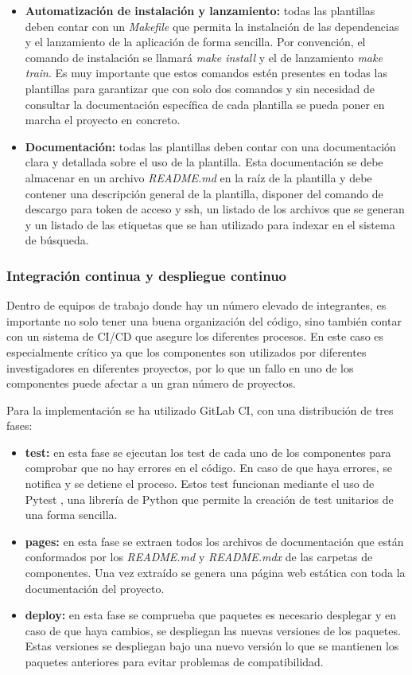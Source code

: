 \begin{itemize}
    \item \textbf{Automatización de instalación y lanzamiento:} todas las plantillas
    deben contar con un \textit{Makefile} que permita la instalación de las dependencias y
    el lanzamiento de la aplicación de forma sencilla. Por convención, el comando
    de instalación se llamará \textit{make install} y el de lanzamiento \textit{make train}.
    Es muy importante que estos comandos estén presentes en todas las plantillas para
    garantizar que con solo dos comandos y sin necesidad de consultar la documentación
    específica de cada plantilla se pueda poner en marcha el proyecto en concreto.
    \item \textbf{Documentación:} todas las plantillas deben contar con una documentación
    clara y detallada sobre el uso de la plantilla. Esta documentación se debe almacenar
    en un archivo \textit{README.md} en la raíz de la plantilla y debe contener una descripción
    general de la plantilla, disponer del comando de descargo para token de acceso y ssh,
    un listado de los archivos que se generan y un listado de las etiquetas que se han
    utilizado para indexar en el sistema de búsqueda.
\end{itemize}

\subsubsection{Integración continua y despliegue continuo}
Dentro de equipos de trabajo donde hay un número elevado de integrantes, es
importante no solo tener una buena organización del código, sino también
contar con un sistema de CI/CD que asegure los diferentes procesos. En este
caso es especialmente crítico ya que los componentes son utilizados por
diferentes investigadores en diferentes proyectos, por lo que un fallo en uno de
los componentes puede afectar a un gran número de proyectos.\medskip

Para la implementación se ha utilizado GitLab CI, con una distribución de 
tres fases: 
\begin{itemize}
    \item \textbf{test:} en esta fase se ejecutan los test de cada uno de los componentes
    para comprobar que no hay errores en el código. En caso de que haya errores, se
    notifica y se detiene el proceso. Estos test funcionan mediante el uso de Pytest \cite{Pytest},
    una librería de Python que permite la creación de test unitarios de una forma sencilla.
    \item \textbf{pages:} en esta fase se extraen todos los archivos de documentación que están 
    conformados por los \textit{README.md} y \textit{README.mdx} de las carpetas de componentes. 
    Una vez extraído se genera una página web estática con toda la documentación del proyecto.
    \item \textbf{deploy:} en esta fase se comprueba que paquetes es necesario desplegar y en caso
    de que haya cambios, se despliegan las nuevas versiones de los paquetes. Estas versiones se despliegan
    bajo una nuevo versión lo que se mantienen los paquetes anteriores para evitar problemas de compatibilidad.
\end{itemize}


